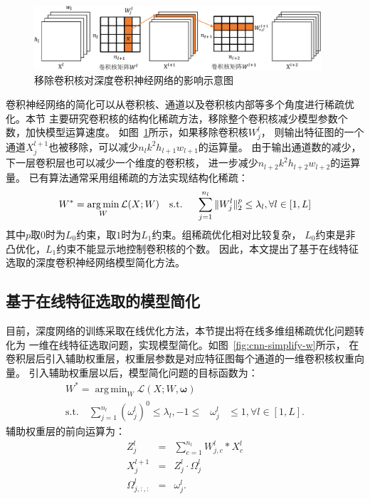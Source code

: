 \documentclass[doctor]{ustcthesis}
\DeclareMathOperator*{\argmin}{arg\,min}
\def \L {\mathcal{L}}
\begin{document}
\begin{figure}[t]
    \centering
    \includegraphics[clip=true, width=0.95\textwidth]{simplify.pdf}
    \caption{移除卷积核对深度卷积神经网络的影响示意图}
    \label{fig:cnn-simplify}
    \vspace{-2em}
\end{figure}

卷积神经网络的简化可以从卷积核、通道以及卷积核内部等多个角度进行稀疏优化。本节
主要研究卷积核的结构化稀疏方法，移除整个卷积核减少模型参数个数，加快模型运算速度。
如图~\ref{fig:cnn-simplify}所示，如果移除卷积核$W^l_j$，
则输出特征图的一个通道$X_j^{l+1}$也被移除，可以减少$n_l k^2 h_{l+1} w_{l+1}$的运算量。
由于输出通道数的减少，下一层卷积层也可以减少一个维度的卷积核，
进一步减少$n_{l+2}k^2h_{l+2}w_{l+2}$的运算量。
已有算法通常采用组稀疏的方法实现结构化稀疏：
\begin{equation}
    W^* = \argmin_{W} \L(X;W) \text{\quad s.t. \quad} \sum_{j=1}^{n_l}\|W_j^l\|_2^p \leq
    \lambda_l, \forall l \in [1,L]
\end{equation}
其中$p$取$0$时为$L_0$约束，取$1$时为$L_1$约束。组稀疏优化相对比较复杂，
$L_0$约束是非凸优化，$L_1$约束不能显示地控制卷积核的个数。
因此，本文提出了基于在线特征选取的深度卷积神经网络模型简化方法。

\subsection{基于在线特征选取的模型简化}
目前，深度网络的训练采取在线优化方法，本节提出将在线多维组稀疏优化问题转化为
一维在线特征选取问题，实现模型简化。如图~\ref{fig:cnn-simplify-w}所示，
在卷积层后引入辅助权重层，权重层参数是对应特征图每个通道的一维卷积核权重向量。
引入辅助权重层以后，模型简化问题的目标函数为：
\begin{eqnarray}
    W^* = \argmin_{W} \L(X;W,\bm{\omega}) \\
    \text{s.t.} \quad
    \sum_{j=1}^{n_l}(\omega_j^l)^0 \leq \lambda_l,
    -1 \leq &\omega_j^l& \leq 1,
    \forall l \in [1,L].
\end{eqnarray}
辅助权重层的前向运算为：
\begin{eqnarray}
    Z_j^l &=& \sum_{c=1}^{n_l}{W_{j,c}^l \ast X_c^l} \\
    X_j^{l+1} &=& Z_j^l \cdot \Omega_j^l \\
    \Omega_{j,:,:}^l &=& \omega_j^l.
\end{eqnarray}
\end{document}
